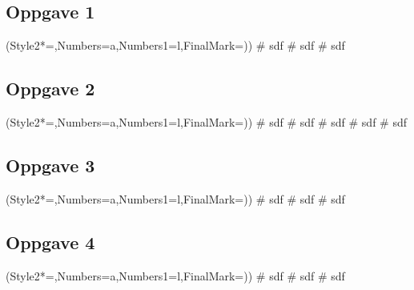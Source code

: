 \subsection*{Oppgave 1}
\begin{easylist}[enumerate]
	\ListProperties(Style2*=,Numbers=a,Numbers1=l,FinalMark={)})
	# sdf
	# sdf
	# sdf
\end{easylist}

\subsection*{Oppgave 2}
\begin{easylist}[enumerate]
	\ListProperties(Style2*=,Numbers=a,Numbers1=l,FinalMark={)})
	# sdf
	# sdf
	# sdf
	# sdf
	# sdf
\end{easylist}



\subsection*{Oppgave 3}
\begin{easylist}[enumerate]
	\ListProperties(Style2*=,Numbers=a,Numbers1=l,FinalMark={)})
	# sdf
	# sdf
	# sdf
\end{easylist}


\subsection*{Oppgave 4}
\begin{easylist}[enumerate]
	\ListProperties(Style2*=,Numbers=a,Numbers1=l,FinalMark={)})
	# sdf
	# sdf
	# sdf
\end{easylist}





